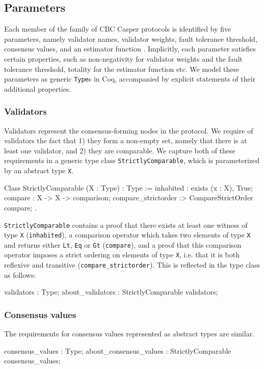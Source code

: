 \documentclass[runningheads]{llncs}
\begin{document}
\subsection{Parameters} 
Each member of the family of CBC Casper protocols is identified by five parameters, namely validator names, validator weights, fault tolerance threshold, consensus values, and an estimator function \cite{CBCfull}. Implicitly, each parameter satisfies certain properties, such as non-negativity for validator weights and the fault tolerance threshold, totality for the estimator function etc. We model these parameters as generic \verb|Type|s in Coq, accompanied by explicit statements of their additional properties. 
\subsubsection{Validators} 
Validators represent the consensus-forming nodes in the protocol. We require of validators the fact that 1) they form a non-empty set, namely that there is at least one validator, and 2) they are comparable. We capture both of these requirements in a generic type class \verb|StrictlyComparable|, which is parameterized by an abstract type \verb|X|. 
\begin{coq}
Class StrictlyComparable (X : Type) : Type :=
	{
	inhabited : exists (x : X), True;
	compare : X -> X -> comparison;
	compare_strictorder :> CompareStrictOrder compare;
	}.
\end{coq}
\verb|StrictlyComparable| contains a proof that there exists at least one witness of type \verb|X| (\verb|inhabited|), a comparison operator which takes two elements of type \verb|X| and returns either \verb|Lt|, \verb|Eq| or \verb|Gt| (\verb|compare|), and a proof that this comparison operator imposes a strict ordering on elements of type \verb|X|, i.e. that it is both reflexive and transitive (\verb|compare_strictorder|). 
This is reflected in the type class as follows: 
\begin{coq}
	validators : Type; 
	about_validators : StrictlyComparable validators;
\end{coq}
\subsubsection{Consensus values} 
The requirements for consensus values represented as abstract types are similar. 
\begin{coq}
	consensus_values : Type; 
	about_consensus_values : StrictlyComparable consensus_values; 
\end{coq}
\end{document}
